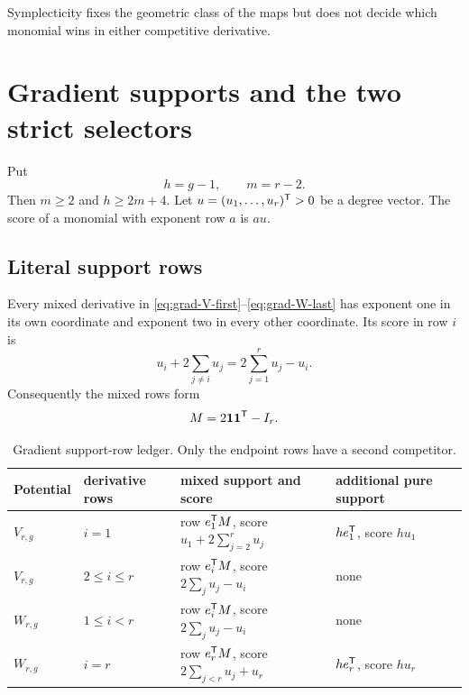 \documentclass[11pt]{article}
\theoremstyle{remark}
\numberwithin{equation}{section}
\begin{document}
Symplecticity fixes the geometric class of the maps but does not decide which
monomial wins in either competitive derivative.

\section{Gradient supports and the two strict selectors}\label{sec:selectors}

Put
\begin{equation}\label{eq:h-m}
h=g-1,\qquad m=r-2.
\end{equation}
Then \(m\geq2\) and \(h\geq2m+4\).  Let
\(u=(u_1,\ldots,u_r)^{\mathsf{T}}>0\) be a degree vector.  The score of a
monomial with exponent row \(a\) is \(au\).

\subsection{Literal support rows}

Every mixed derivative in
\eqref{eq:grad-V-first}--\eqref{eq:grad-W-last} has exponent one in its own
coordinate and exponent two in every other coordinate.  Its score in row
\(i\) is
\begin{equation}\label{eq:mixed-score}
u_i+2\sum_{j\neq i}u_j=2\sum_{j=1}^{r}u_j-u_i.
\end{equation}
Consequently the mixed rows form
\begin{equation}\label{eq:M}
M=2\mathbf{1}\mathbf{1}^{\mathsf{T}}-I_r.
\end{equation}

\begin{table}[ht]
\centering
\small
\caption{Gradient support-row ledger.  Only the endpoint rows have a second
competitor.}
\label{tab:support-ledger}
\begin{tabularx}{\textwidth}{@{}p{}p{}X X@{}}
\toprule
Potential & derivative rows & mixed support and score & additional pure support \\
\midrule
\(V_{r,g}\) & \(i=1\) & row \(e_1^{\mathsf{T}}M\), score
\(u_1+2\sum_{j=2}^{r}u_j\) & \(he_1^{\mathsf{T}}\), score \(hu_1\) \\
\(V_{r,g}\) & \(2\leq i\leq r\) & row \(e_i^{\mathsf{T}}M\), score
\(2\sum_j u_j-u_i\) & none \\
\(W_{r,g}\) & \(1\leq i<r\) & row \(e_i^{\mathsf{T}}M\), score
\(2\sum_j u_j-u_i\) & none \\
\(W_{r,g}\) & \(i=r\) & row \(e_r^{\mathsf{T}}M\), score
\(2\sum_{j<r}u_j+u_r\) & \(he_r^{\mathsf{T}}\), score \(hu_r\) \\
\bottomrule
\end{tabularx}
\end{table}
\end{document}
